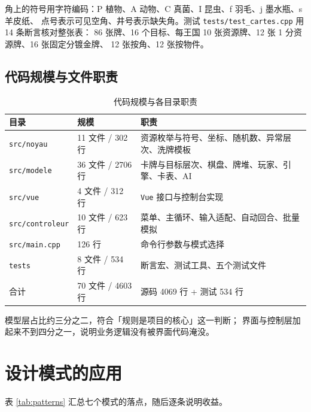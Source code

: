 \documentclass[11pt,a4paper]{ctexart}
\newcommand{\cl}[1]{\texttt{#1}}
\begin{document}
角上的符号用字符编码：P 植物、A 动物、C 真菌、I 昆虫、f 羽毛、j 墨水瓶、s 羊皮纸、
点号表示可见空角、井号表示缺失角。测试 \cl{tests/test\_cartes.cpp} 用 14 条断言核对整张表：
86 张牌、16 个目标、每王国 10 张资源牌、12 张 1 分资源牌、16 张固定分镀金牌、
12 张按角、12 张按物件。

\subsection{代码规模与文件职责}
\begin{table}[h]
\centering
\small
\begin{tabular}{p{2.8cm}p{3.0cm}p{8.2cm}}
\toprule
目录 & 规模 & 职责 \\
\midrule
\cl{src/noyau} & 11 文件 / 302 行 & 资源枚举与符号、坐标、随机数、异常层次、洗牌模板 \\
\cl{src/modele} & 36 文件 / 2706 行 & 卡牌与目标层次、棋盘、牌堆、玩家、引擎、卡表、AI \\
\cl{src/vue} & 4 文件 / 312 行 & \cl{Vue} 接口与控制台实现 \\
\cl{src/controleur} & 10 文件 / 623 行 & 菜单、主循环、输入适配、自动回合、批量模拟 \\
\cl{src/main.cpp} & 126 行 & 命令行参数与模式选择 \\
\cl{tests} & 8 文件 / 534 行 & 断言宏、测试工具、五个测试文件 \\
\midrule
合计 & 70 文件 / 4603 行 & 源码 4069 行 + 测试 534 行 \\
\bottomrule
\end{tabular}
\caption{代码规模与各目录职责}
\label{tab:taille}
\end{table}
模型层占比约三分之二，符合「规则是项目的核心」这一判断；
界面与控制层加起来不到四分之一，说明业务逻辑没有被界面代码淹没。

\section{设计模式的应用}
表 \ref{tab:patterns} 汇总七个模式的落点，随后逐条说明收益。
\end{document}
